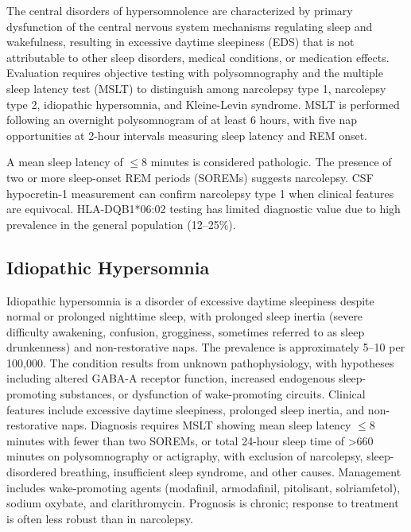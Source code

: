 The central disorders of hypersomnolence are characterized by primary dysfunction of the central nervous system mechanisms regulating sleep and wakefulness, resulting in excessive daytime sleepiness (EDS) that is not attributable to other sleep disorders, medical conditions, or medication effects. Evaluation requires objective testing with polysomnography and the multiple sleep latency test (MSLT) to distinguish among narcolepsy type 1, narcolepsy type 2, idiopathic hypersomnia, and Kleine-Levin syndrome. MSLT is performed following an overnight polysomnogram of at least 6 hours, with five nap opportunities at 2-hour intervals measuring sleep latency and REM onset.

A mean sleep latency of $\le$8 minutes is considered pathologic. The presence of two or more sleep-onset REM periods (SOREMs) suggests narcolepsy. CSF hypocretin-1 measurement can confirm narcolepsy type 1 when clinical features are equivocal. HLA-DQB1*06:02 testing has limited diagnostic value due to high prevalence in the general population (12--25\%).

\subsection{Idiopathic Hypersomnia}
\label{sec:Idiopathic Hypersomnia}
Idiopathic hypersomnia is a disorder of excessive daytime sleepiness despite normal or prolonged nighttime sleep, with prolonged sleep inertia (severe difficulty awakening, confusion, grogginess, sometimes referred to as sleep drunkenness) and non-restorative naps. The prevalence is approximately 5--10 per 100,000. The condition results from unknown pathophysiology, with hypotheses including altered GABA-A receptor function, increased endogenous sleep-promoting substances, or dysfunction of wake-promoting circuits. Clinical features include excessive daytime sleepiness, prolonged sleep inertia, and non-restorative naps. Diagnosis requires MSLT showing mean sleep latency $\le$8 minutes with fewer than two SOREMs, or total 24-hour sleep time of >660 minutes on polysomnography or actigraphy, with exclusion of narcolepsy, sleep-disordered breathing, insufficient sleep syndrome, and other causes. Management includes wake-promoting agents (modafinil, armodafinil, pitolisant, solriamfetol), sodium oxybate, and clarithromycin. Prognosis is chronic; response to treatment is often less robust than in narcolepsy.


